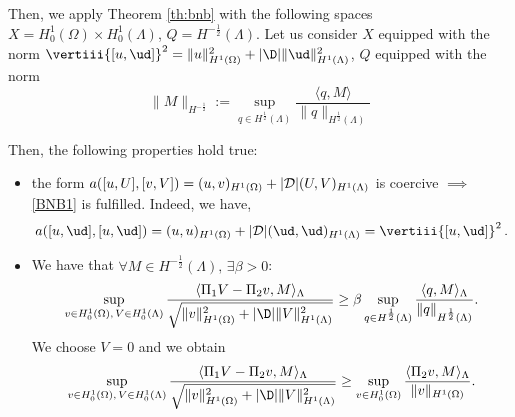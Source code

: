 Then, we apply Theorem \ref{th:bnb} with the following spaces $X=H^1_0(\Omega) \times H^1_0(\Lambda)$, $Q=H^{-\frac 12}(\Lambda)$.
Let us consider $X$ equipped with the norm $\vertiii{[u,\ud ]}^2=\|u\|^2_{H^1(\Omega)} + |\D|\|\ud\|^2_{H^1(\Lambda)}$, 
$Q$ equipped with the norm
\begin{equation*}
\|M \|_{H^{-\frac 12}} := \sup_{q\in H^{\frac 12}(\Lambda)}\frac{\langle q, M\rangle}{\|q\|_{H^{\frac 12}(\Lambda)}}
\end{equation*}

Then, the following properties hold true:
\begin{itemize}
\item the form $a([u,U], [v,V])= (u,v)_{H^1(\Omega)} + |{\cal D}|(U,V)_{H^1(\Lambda)}$ is coercive 
$\implies$ \eqref{BNB1} is fulfilled. Indeed, we have,
\begin{equation*}
a([u,\ud], [u,\ud])= (u,u)_{H^1(\Omega)} + |{\cal D}|(\ud,\ud)_{H^1(\Lambda)} = \vertiii{[u,\ud]}^2\,.
\end{equation*}

\item We have that $\forall M \in H^{-\frac 12}(\Lambda),\, \exists \beta >0$:
\begin{equation*}
\sup _{v\in H^1_0(\Omega),\, V \in H^1_0(\Lambda)} \frac{ \langle  \Pi_1 V - \Pi_2 v, M \rangle_\Lambda}{\sqrt{\|v\|^2_{H^1(\Omega)}+|\D| \|V \|^2_{H^1(\Lambda)}}}
\geq \beta \sup_{q\in H^{\frac 12}(\Lambda)}\frac{\langle q, M\rangle_\Lambda}{\|q\|_{H^{\frac 12}(\Lambda)}}.
\end{equation*}
We choose $V=0$ and we obtain
\begin{equation*}
\sup _{v\in H^1_0(\Omega),\, V \in H^1_0(\Lambda)} \frac{ \langle  \Pi_1 V - \Pi_2 v, M \rangle_\Lambda}{\sqrt{\|v\|^2_{H^1(\Omega)}+|\D|\|V \|^2_{H^1(\Lambda)}}}
\geq \sup _{v\in H^1_0(\Omega)} \frac{ \langle \Pi_2 v, M \rangle_\Lambda}{\|v\|_{H^1(\Omega)}}. 
\end{equation*}


\end{itemize}
